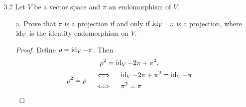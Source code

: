 \documentclass[11pt]{article}
\begin{document}
\begin{enumerate}
          \vspace{1em}

          \pagebreak

    \item[3.7] Let $V$ be a vector space and $\pi$ an endomorphism of $V$.

          \begin{enumerate}
              \item[a.] Prove that $\pi$ is a projection if and only if $\operatorname{id}_V - \pi$ is a projection, where $\operatorname{id}_V$
                    is the identity endomorphism on $V$.

                    \begin{proof}
                        Define $\rho = \operatorname{id}_V - \pi$.  Then
                        \[
                            \rho^2 = \operatorname{id}_V - 2 \pi + \pi^2.
                        \]
                        \[
                            \rho^2 = \rho
                            \begin{aligned}
                                 & \quad \iff \quad
                                \operatorname{id}_V - 2 \pi + \pi^2 = \operatorname{id}_V - \pi \\
                                 & \quad \iff \quad
                                \pi^2 = \pi                         \\
                            \end{aligned}
                        \]
                    \end{proof}


\end{enumerate}
\end{enumerate}
\end{document}

